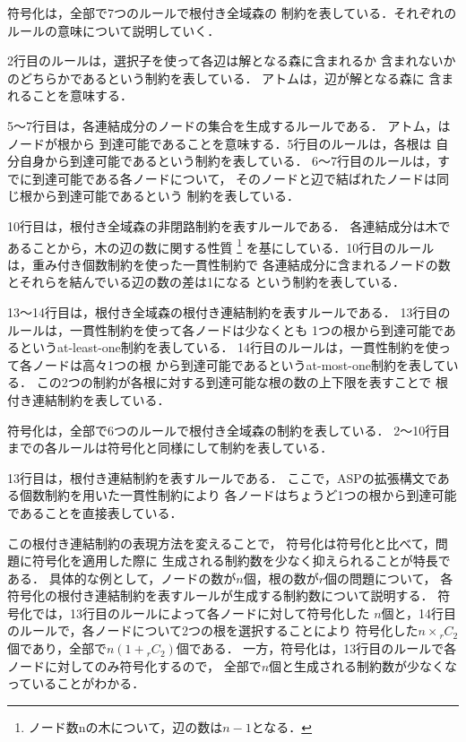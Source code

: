符号化は，全部で7つのルールで根付き全域森の
制約を表している．それぞれのルールの意味について説明していく．

2行目のルールは，選択子を使って各辺は解となる森に含まれるか
含まれないかのどちらかであるという制約を表している．
アトムは，辺が解となる森に
含まれることを意味する．

5～7行目は，各連結成分のノードの集合を生成するルールである．
アトム，はノードが根から
到達可能であることを意味する．5行目のルールは，各根は
自分自身から到達可能であるという制約を表している．
6～7行目のルールは，すでに到達可能である各ノードについて，
そのノードと辺で結ばれたノードは同じ根から到達可能であるという
制約を表している．

10行目は，根付き全域森の非閉路制約を表すルールである．
各連結成分は木であることから，木の辺の数に関する性質
\footnote{ノード数nの木について，辺の数は$n - 1$となる．}
を基にしている．10行目のルールは，重み付き個数制約を使った一貫性制約で
各連結成分に含まれるノードの数とそれらを結んでいる辺の数の差は1になる
という制約を表している．

13～14行目は，根付き全域森の根付き連結制約を表すルールである．
13行目のルールは，一貫性制約を使って各ノードは少なくとも
1つの根から到達可能であるというat-least-one制約を表している．
14行目のルールは，一貫性制約を使って各ノードは高々1つの根
から到達可能であるというat-most-one制約を表している．
この2つの制約が各根に対する到達可能な根の数の上下限を表すことで
根付き連結制約を表している．

符号化は，全部で6つのルールで根付き全域森の制約を表している．
2～10行目までの各ルールは符号化と同様にして制約を表している．

13行目は，根付き連結制約を表すルールである．
ここで，ASPの拡張構文である個数制約を用いた一貫性制約により
各ノードはちょうど1つの根から到達可能であることを直接表している．

この根付き連結制約の表現方法を変えることで，
符号化は符号化と比べて，問題に符号化を適用した際に
生成される制約数を少なく抑えられることが特長である．
具体的な例として，ノードの数が$n$個，根の数が$r$個の問題について，
各符号化の根付き連結制約を表すルールが生成する制約数について説明する．
符号化では，13行目のルールによって各ノードに対して符号化した
$n$個と，14行目のルールで，各ノードについて2つの根を選択することにより
符号化した$n\times{}_rC_2$個であり，全部で$n(1+{}_rC_2)$個である．
一方，符号化は，13行目のルールで各ノードに対してのみ符号化するので，
全部で$n$個と生成される制約数が少なくなっていることがわかる．